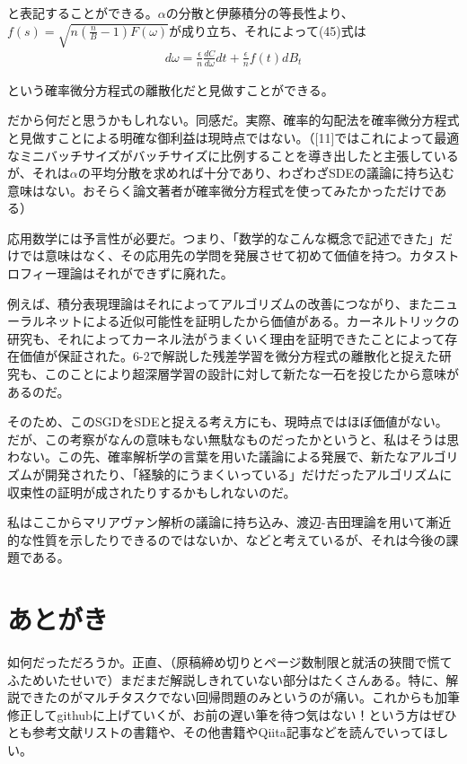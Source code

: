 \documentclass[dvipdfmx, a4paper]{jsarticle}
\begin{document}
と表記することができる。$\alpha$の分散と伊藤積分の等長性より、$f(s)=\sqrt{n(\frac{n}{B}-1)F(\omega)}$が成り立ち、それによって(45)式は
\begin{align}
d\omega=\frac{\epsilon}{n}\frac{dC}{d\omega}dt+\frac{\epsilon}{n}f(t)dB_t
\end{align}

という確率微分方程式の離散化だと見做すことができる。

だから何だと思うかもしれない。同感だ。実際、確率的勾配法を確率微分方程式と見做すことによる明確な御利益は現時点ではない。（[11]ではこれによって最適なミニバッチサイズがバッチサイズに比例することを導き出したと主張しているが、それは$\alpha$の平均分散を求めれば十分であり、わざわざSDEの議論に持ち込む意味はない。おそらく論文著者が確率微分方程式を使ってみたかっただけである）

応用数学には予言性が必要だ。つまり、「数学的なこんな概念で記述できた」だけでは意味はなく、その応用先の学問を発展させて初めて価値を持つ。カタストロフィー理論はそれができずに廃れた。

例えば、積分表現理論はそれによってアルゴリズムの改善につながり、またニューラルネットによる近似可能性を証明したから価値がある。カーネルトリックの研究も、それによってカーネル法がうまくいく理由を証明できたことによって存在価値が保証された。6-2で解説した残差学習を微分方程式の離散化と捉えた研究も、このことにより超深層学習の設計に対して新たな一石を投じたから意味があるのだ。

そのため、このSGDをSDEと捉える考え方にも、現時点ではほぼ価値がない。だが、この考察がなんの意味もない無駄なものだったかというと、私はそうは思わない。この先、確率解析学の言葉を用いた議論による発展で、新たなアルゴリズムが開発されたり、「経験的にうまくいっている」だけだったアルゴリズムに収束性の証明が成されたりするかもしれないのだ。

私はここからマリアヴァン解析の議論に持ち込み、渡辺-吉田理論を用いて漸近的な性質を示したりできるのではないか、などと考えているが、それは今後の課題である。


\newpage
\section{あとがき}
如何だっただろうか。正直、（原稿締め切りとページ数制限と就活の狭間で慌てふためいたせいで）まだまだ解説しきれていない部分はたくさんある。特に、解説できたのがマルチタスクでない回帰問題のみというのが痛い。これからも加筆修正してgithubに上げていくが、お前の遅い筆を待つ気はない！という方はぜひとも参考文献リストの書籍や、その他書籍やQiita記事などを読んでいってほしい。
\end{document}
